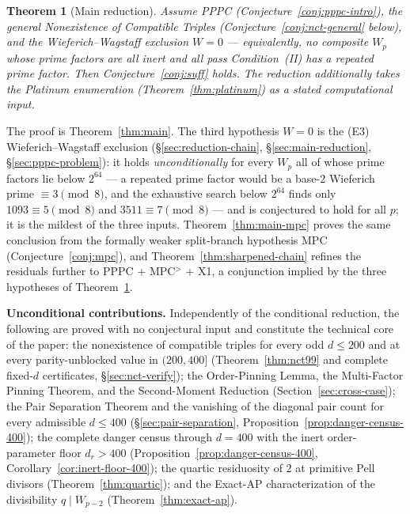 \documentclass[11pt]{amsart}
\theoremstyle{plain}
\newtheorem{theorem}{Theorem}[section]
\theoremstyle{definition}
\theoremstyle{remark}
\numberwithin{equation}{section}
\begin{document}
\begin{theorem}[Main reduction]\label{thm:main-intro}
Assume PPPC (Conjecture~\ref{conj:pppc-intro}), the general Nonexistence of Compatible Triples (Conjecture~\ref{conj:nct-general} below), and the Wieferich--Wagstaff exclusion $W = 0$ --- equivalently, no composite $W_p$ whose prime factors are all inert and all pass Condition~(II) has a repeated prime factor. Then Conjecture~\ref{conj:suff} holds. The reduction additionally takes the Platinum enumeration (Theorem~\ref{thm:platinum}) as a stated computational input.
\end{theorem}

The proof is Theorem~\ref{thm:main}. The third hypothesis $W = 0$ is the (E3) Wieferich--Wagstaff exclusion (\S\ref{sec:reduction-chain}, \S\ref{sec:main-reduction}, \S\ref{sec:pppc-problem}): it holds \emph{unconditionally} for every $W_p$ all of whose prime factors lie below $2^{64}$ --- a repeated prime factor would be a base-$2$ Wieferich prime $\equiv 3 \pmod 8$, and the exhaustive search below $2^{64}$ finds only $1093\equiv5\pmod8$ and $3511\equiv7\pmod8$ \cite{ref:OEISWieferich} --- and is conjectured to hold for all $p$; it is the mildest of the three inputs. Theorem~\ref{thm:main-mpc} proves the same conclusion from the formally weaker split-branch hypothesis MPC (Conjecture~\ref{conj:mpc}), and Theorem~\ref{thm:sharpened-chain} refines the residuals further to PPPC + MPC$^{>}$ + X1, a conjunction implied by the three hypotheses of Theorem~\ref{thm:main-intro}.

\textbf{Unconditional contributions.} Independently of the conditional reduction, the following are proved with no conjectural input and constitute the technical core of the paper: the nonexistence of compatible triples for every odd $d \leq 200$ and at every parity-unblocked value in $(200, 400]$ (Theorem~\ref{thm:nct99} and complete fixed-$d$ certificates, \S\ref{sec:nct-verify}); the Order-Pinning Lemma, the Multi-Factor Pinning Theorem, and the Second-Moment Reduction (Section~\ref{sec:cross-case}); the Pair Separation Theorem and the vanishing of the diagonal pair count for every admissible $d \leq 400$ (\S\ref{sec:pair-separation}, Proposition~\ref{prop:danger-census-400}); the complete danger census through $d = 400$ with the inert order-parameter floor $d_r > 400$ (Proposition~\ref{prop:danger-census-400}, Corollary~\ref{cor:inert-floor-400}); the quartic residuosity of $2$ at primitive Pell divisors (Theorem~\ref{thm:quartic}); and the Exact-AP characterization of the divisibility $q \mid W_{p-2}$ (Theorem~\ref{thm:exact-ap}).
\end{document}
